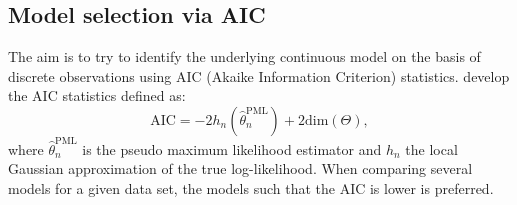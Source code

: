 \subsection{Model selection via AIC}
The aim is to try to identify the underlying continuous model on the basis of discrete observations using AIC (Akaike Information Criterion) statistics.
\citet{UchidaandYoshida2005} develop the AIC statistics defined as:
\begin{equation}\label{eq19}
  \mathrm{AIC} = -2h_{n}\left(\hat{\theta}^{\mathrm{PML}}_{n}\right) + 2 \mathrm{dim}(\Theta),
\end{equation}
where $\hat{\theta}^{\mathrm{PML}}_{n}$ is the pseudo maximum likelihood estimator and $h_{n}$ the local Gaussian
approximation of the true log-likelihood. When comparing several models for a given data set, the models such that the AIC is lower is preferred.


